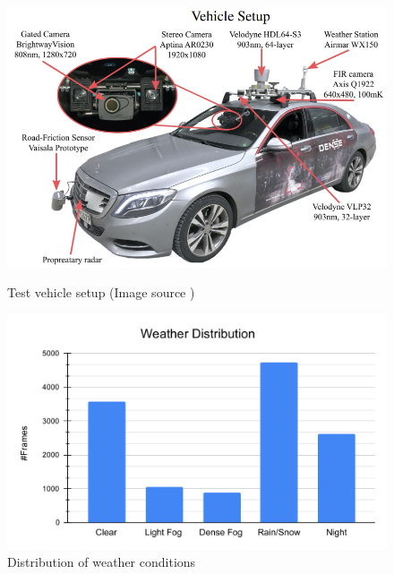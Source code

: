 \documentclass[report.tex]{subfiles}
\begin{document}
        \begin{figure}[h]
            \centering
            \begin{minipage}{0.45\textwidth}
                \centering
                \includegraphics[width=\textwidth]{images/datasets/dense/test_vehicle_setup.png}
                \caption{Test vehicle setup (Image source \cite{bijelic2020seeing})}
                \label{fig:dense_test_vehicle_setup}
            \end{minipage}
            \hfill
            \begin{minipage}{0.45\textwidth}
                \centering
                \includegraphics[width=\textwidth]{images/datasets/dense/distribution_of_weather_conditions.pdf}
                \caption{Distribution of weather conditions \cite{bijelic2020seeing}}
                \label{fig:dense_distribution_of_weather_conditions}
            \end{minipage}
        \end{figure}
        
\end{document}
